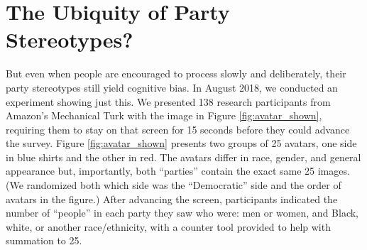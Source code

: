 \documentclass[12pt, letterpaper]{article}
\begin{document}
\section{The Ubiquity of Party Stereotypes?}

But even when people are encouraged to process slowly and deliberately, their party stereotypes still yield cognitive bias. In August 2018, we conducted an experiment showing just this. We presented 138 research participants from Amazon's Mechanical Turk with the image in Figure \ref{fig:avatar_shown}, requiring them to stay on that screen for 15 seconds before they could advance the survey. Figure \ref{fig:avatar_shown} presents two groups of 25 avatars, one side in blue shirts and the other in red. The avatars differ in race, gender, and general appearance but, importantly, both ``parties'' contain the exact same 25 images. (We randomized both which side was the ``Democratic'' side and the order of avatars in the figure.) After advancing the screen, participants indicated the number of ``people'' in each party they saw who were: men or women, and Black, white, or another race/ethnicity, with a counter tool provided to help with summation to 25. 
\end{document}
